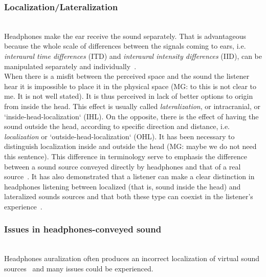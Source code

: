 \documentclass[journal]{IEEEtran}
\begin{document}
\subsubsection*{Localization/Lateralization}~\\
Headphones make the ear receive the sound separately. That is advantageous because the whole scale of differences between the signals coming to ears, i.e. \emph{interaural time differences} (ITD) and \emph{interaural intensity differences} (IID), can be manipulated separately and individually~\cite{}.\\
When there is a misfit between the perceived space and the sound the listener hear it is impossible to place it in the physical space (MG: to this is not clear to me. It is not well stated). It is thus perceived in lack of better options to origin from inside the head\cite{}. This effect is usually called \emph{lateralization}, or intracranial, or `inside-head-localization` (IHL). On the opposite, there is the effect of having the sound outside the head, according to specific direction and distance, i.e. \emph{localization} or `outside-head-localization` (OHL).
It has been necessary to distinguish localization inside and outside the head (MG: maybe we do not need this sentence). This difference in terminology serve to emphasis the difference between a sound source conveyed directly by headphones and that of a real source~\cite{}. It has also demonstrated that a listener can make a clear distinction in headphones listening between localized (that is, sound inside the head) and lateralized sounds sources and that both these type can coexist in the listener's experience~\cite{}.  \\

\subsubsection*{Issues in headphones-conveyed sound}~\\
Headphones auralization often produces an incorrect localization of virtual sound sources~\cite{} and many issues could be experienced.\\
\end{document}

